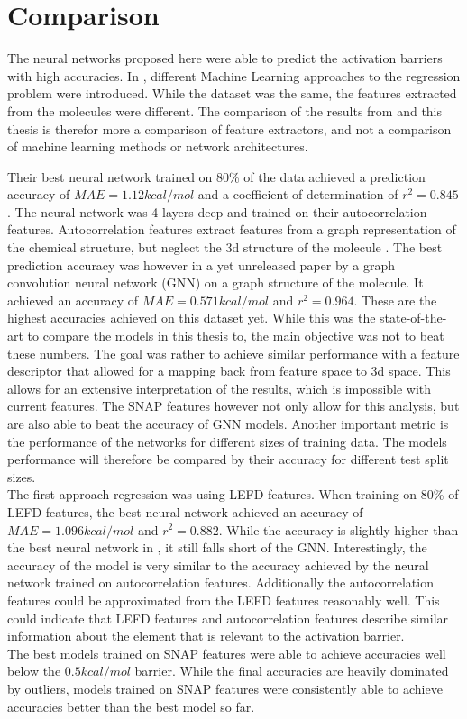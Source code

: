 \section{Comparison}
\label{sec:Evaluation:Comparison}

The neural networks proposed here were able to predict the activation barriers with high accuracies.
In \cite{friederich_dos}, different Machine Learning approaches to the regression problem were introduced.
While the dataset was the same, the features extracted from the molecules were different.
The comparison of the results from  and this thesis is therefor more 
a comparison of feature extractors, and not a comparison of machine learning methods or network architectures.

Their best neural network trained on 80\% of the data achieved a prediction accuracy of $MAE = 1.12 kcal/mol$ and a 
coefficient of determination of $r^2 = 0.845$.
The neural network was 4 layers deep and trained on their autocorrelation features.
Autocorrelation features extract features from a graph representation of the chemical structure, but neglect the 
3d structure of the molecule \cite{friederich_dos}.
The best prediction accuracy was however in a yet unreleased paper by  a graph convolution neural network (GNN) on 
a graph structure of the molecule.
It achieved an accuracy of $MAE = 0.571 kcal/mol$ and $r^2=0.964$.
These are the highest accuracies achieved on this dataset yet.
While this was the state-of-the-art  to compare the models in this thesis to, the main objective was not to beat these numbers.
The goal was rather to achieve similar performance with a feature descriptor that allowed for a mapping back from feature space to 3d space.
This allows for an extensive interpretation of the results, which is impossible with current features.
The SNAP features however not only allow for this analysis, but are also able to beat the accuracy of GNN models.
Another important metric is the performance of the networks for different sizes of training data.
The models performance will therefore be compared by their accuracy for different test split sizes.
\\
The first approach regression was using LEFD features.
When training on 80\% of LEFD features, the best neural network achieved an accuracy of $MAE = 1.096 kcal/mol$ and $r^2=0.882$.
While the accuracy is slightly higher than the best neural network in \cite{friederich_dos}, it still falls short 
of the GNN.
Interestingly, the accuracy of the model is very similar to the accuracy achieved by the neural network trained on autocorrelation 
features.
Additionally the autocorrelation features could be approximated from the LEFD features reasonably well.
This could indicate that LEFD features and autocorrelation features describe
similar information about the element that is relevant to the activation barrier.
\\
The best models trained on SNAP features were able to achieve accuracies well below the $0.5 kcal/mol$ barrier.
While the final accuracies are heavily dominated by outliers, models trained on SNAP features were consistently
able to achieve accuracies better than the best model so far.
